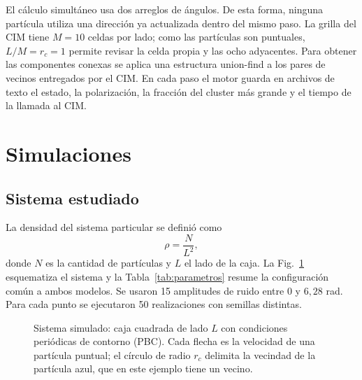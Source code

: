 \documentclass[11pt,a4paper]{article}
\begin{document}
El cálculo simultáneo usa dos arreglos de ángulos. De esta forma, ninguna
partícula utiliza una dirección ya actualizada dentro del mismo paso. La grilla
del CIM tiene $M=10$ celdas por lado; como las partículas son puntuales,
$L/M=r_c=1$ permite revisar la celda propia y las ocho adyacentes. Para obtener
las componentes conexas se aplica una estructura union-find a los pares de
vecinos entregados por el CIM. En cada paso el motor guarda en archivos de
texto el estado, la polarización, la fracción del cluster más grande y el
tiempo de la llamada al CIM.

\section{Simulaciones}

\subsection{Sistema estudiado}

La densidad del sistema particular se definió como
\begin{equation}
    \rho = \frac{N}{L^2},
    \label{eq:density}
\end{equation}
donde $N$ es la cantidad de partículas y $L$ el lado de la caja. La
Fig.~\ref{fig:sistema} esquematiza el sistema y la
Tabla~\ref{tab:parametros} resume la configuración común a ambos modelos. Se
usaron 15 amplitudes de ruido entre $0$ y $6{,}28$ rad. Para cada punto se
ejecutaron 50 realizaciones con semillas distintas.

\begin{figure}[H]
    \centering
    \caption{Sistema simulado: caja cuadrada de lado $L$ con condiciones
    periódicas de contorno (PBC). Cada flecha es la velocidad de una partícula
    puntual; el círculo de radio $r_c$ delimita la vecindad de la partícula
    azul, que en este ejemplo tiene un vecino.}
    \label{fig:sistema}
\end{figure}
\end{document}
